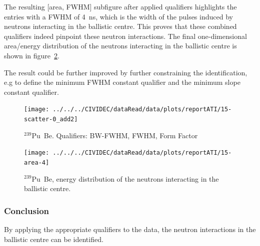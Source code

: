 The resulting [area, FWHM] subfigure after applied qualifiers highlights the entries with a FWHM of 4~ns, which is the width of the pulses induced by neutrons interacting in the ballistic centre. This proves that these combined qualifiers indeed pinpoint these neutron interactions. The final one-dimensional area/energy distribution of the neutrons interacting in the ballistic centre is shown in figure~\ref{fig:scatterpuarea}. 

The result could be further improved by further constraining the identification, e.g to define the minimum FWHM constant qualifier and the minimum slope constant qualifier.




\begin{figure}[]
\centering
\texttt{[image: ../../../CIVIDEC/dataRead/data/plots/reportATI/15-scatter-0\_add2]}
\caption{$^{239}$Pu~Be. Qualifiers: BW-FWHM, FWHM, Form Factor}
\label{fig:scatterpu}
\end{figure}

\begin{figure}[]
\centering
\texttt{[image: ../../../CIVIDEC/dataRead/data/plots/reportATI/15-area-4]}
\caption{$^{239}$Pu~Be, energy distribution of the neutrons interacting in the ballistic centre.}
\label{fig:scatterpuarea}
\end{figure}


\subsubsection{Conclusion}
By applying the appropriate qualifiers to the data, the neutron interactions in the ballistic centre can be identified.



